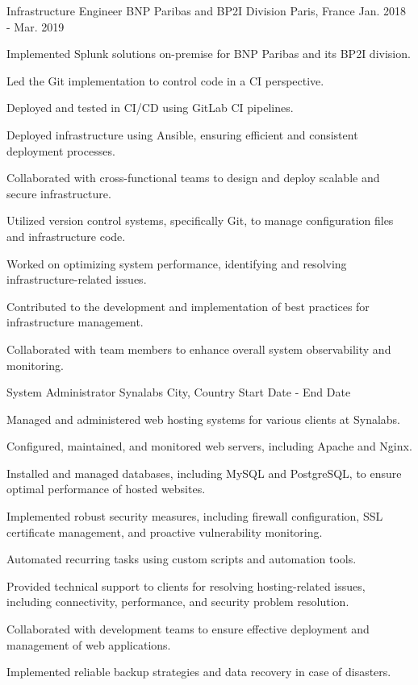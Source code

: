 \begin{cventries}
\cventry
{Infrastructure Engineer} %
{BNP Paribas and BP2I Division} %
{Paris, France} %
{Jan. 2018 - Mar. 2019} %
{
  \begin{cvitems} %
    \item {Implemented Splunk solutions on-premise for BNP Paribas and its BP2I division.}
    \item {Led the Git implementation to control code in a CI perspective.}
    \item {Deployed and tested in CI/CD using GitLab CI pipelines.}
    \item {Deployed infrastructure using Ansible, ensuring efficient and consistent deployment processes.}
    \item {Collaborated with cross-functional teams to design and deploy scalable and secure infrastructure.}
    \item {Utilized version control systems, specifically Git, to manage configuration files and infrastructure code.}
    \item {Worked on optimizing system performance, identifying and resolving infrastructure-related issues.}
    \item {Contributed to the development and implementation of best practices for infrastructure management.}
    \item {Collaborated with team members to enhance overall system observability and monitoring.}
  \end{cvitems}
}
\cventry
{System Administrator} %
{Synalabs} %
{City, Country} %
{Start Date - End Date} %
{
  \begin{cvitems} %
    \item {Managed and administered web hosting systems for various clients at Synalabs.}
    \item {Configured, maintained, and monitored web servers, including Apache and Nginx.}
    \item {Installed and managed databases, including MySQL and PostgreSQL, to ensure optimal performance of hosted websites.}
    \item {Implemented robust security measures, including firewall configuration, SSL certificate management, and proactive vulnerability monitoring.}
    \item {Automated recurring tasks using custom scripts and automation tools.}
    \item {Provided technical support to clients for resolving hosting-related issues, including connectivity, performance, and security problem resolution.}
    \item {Collaborated with development teams to ensure effective deployment and management of web applications.}
    \item {Implemented reliable backup strategies and data recovery in case of disasters.}
  \end{cvitems}
}


\end{cventries}
